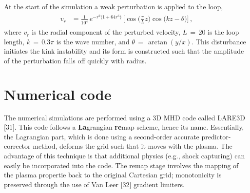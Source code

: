 \documentclass{./packages/rs/rsproca}
\begin{document}
At the start of the simulation a weak perturbation is applied to the loop,
\begin{align}\begin{split}
\label{eqn_perturbed_radial_velocity}
v_r &= \frac{1}{10^{4}}\,e^{-r^2\big(1+64r^6\big)}\,\Bigg[\cos{\Bigg(\frac{\pi}{L} z\Bigg)}\cos\big(kz-\theta\big)\Bigg]\,,
\end{split}\end{align}
where $v_r$ is the radial component of the perturbed velocity, $L\,{=}\,20$ is the loop length, $k\,{=}\,0.3\pi$ is the wave number, and $\theta\,{=}\,\arctan(y/x)$. This disturbance initiates the kink instability and its form is constructed such that the amplitude of the perturbation falls off quickly with radius.

\section{Numerical code}
\label{sec_NumericalCode}
The numerical simulations are performed using a 3D MHD code called LARE3D [31]. This code follows a \textbf{La}grangian \textbf{re}map scheme, hence its name. Essentially, the Lagrangian part, which is done using a second-order accurate predictor-corrector method, deforms the grid such that it moves with the plasma. The advantage of this technique is that additional physics (e.g., shock capturing) can easily be incorporated into the code. The remap stage involves the mapping of the plasma propertie back to the original Cartesian grid; monotonicity is preserved through the use of Van Leer [32] gradient limiters.
\end{document}
